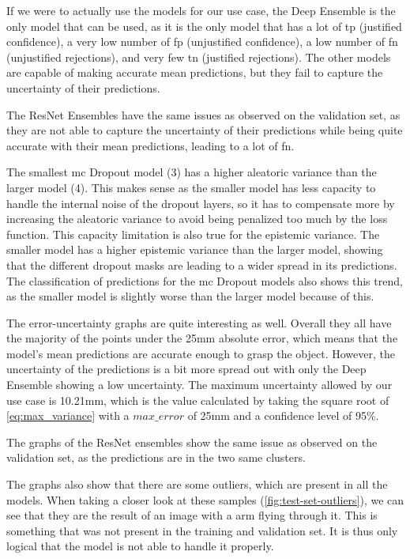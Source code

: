 If we were to actually use the models for our use case, the Deep Ensemble is the only model that can be used, as it is the only model that has a lot of \gls{tp} (justified confidence), a very low number of \gls{fp} (unjustified confidence), a low number of \gls{fn} (unjustified rejections), and very few \gls{tn} (justified rejections).
The other models are capable of making accurate mean predictions, but they fail to capture the uncertainty of their predictions.

The ResNet Ensembles have the same issues as observed on the validation set, as they are not able to capture the uncertainty of their predictions while being quite accurate with their mean predictions, leading to a lot of \gls{fn}.

The smallest \gls{mc} Dropout model (3) has a higher aleatoric variance than the larger model (4). 
This makes sense as the smaller model has less capacity to handle the internal noise of the dropout layers, so it has to compensate more by increasing the aleatoric variance to avoid being penalized too much by the loss function.
This capacity limitation is also true for the epistemic variance. 
The smaller model has a higher epistemic variance than the larger model, showing that the different dropout masks are leading to a wider spread in its predictions. 
The classification of predictions for the \gls{mc} Dropout models also shows this trend, as the smaller model is slightly worse than the larger model because of this.

The error-uncertainty graphs are quite interesting as well.
Overall they all have the majority of the points under the 25mm absolute error, which means that the model's mean predictions are accurate enough to grasp the object.
However, the uncertainty of the predictions is a bit more spread out with only the Deep Ensemble showing a low uncertainty.
The maximum uncertainty allowed by our use case is 10.21mm, which is the value calculated by taking the square root of \cref{eq:max_variance} with a $max\_error$ of 25mm and a confidence level of 95\%.

The graphs of the ResNet ensembles show the same issue as observed on the validation set, as the predictions are in the two same clusters.

The graphs also show that there are some outliers, which are present in all the models.
When taking a closer look at these samples (\cref{fig:test-set-outliers}), we can see that they are the result of an image with a arm flying through it.
This is something that was not present in the training and validation set.
It is thus only logical that the model is not able to handle it properly.

